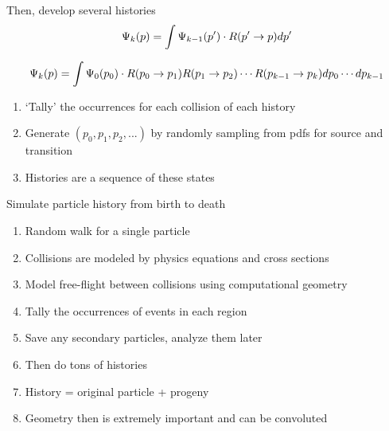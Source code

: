 \documentclass[aspectratio=1610,pdftex,dvipsnames,compress,xcolor={dvipsnames}]{beamer}
\begin{document}
\addtocounter{framenumber}{-1} 
\begin{frame}{Then, develop several histories}
    \begin{equation}
        \LARGE
        \Psi_k(p) = \int \Psi_{k-1}(p') \cdot R(p' \rightarrow p)dp'
    \end{equation}

    \begin{equation}
        \large
        \Psi_k(p) = \int \Psi_0(p_0) \cdot R(p_0 \rightarrow p_1) R(p_1 \rightarrow p_2) \cdots R(p_{k-1} \rightarrow p_k)dp_0 \cdots dp_{k-1}
    \end{equation}

    \vspace*{\fill}

    \begin{enumerate}[series=outerlist,topsep=0pt,itemsep=21pt,leftmargin=*,label=(\arabic*)]
        \item[]`Tally' the occurrences for each collision of each history
        \item[]Generate $(p_0,p_1,p_2,...)$ by randomly sampling from pdfs for source and transition
        \item[]Histories are a sequence of these states
    \end{enumerate}
\end{frame}


\begin{frame}{Simulate particle history from birth to death}
    \begin{enumerate}[series=outerlist,topsep=0pt,itemsep=17pt,leftmargin=*,label=(\arabic*)]
        \item[]Random walk for a single particle
        \item[]Collisions are modeled by physics equations and cross sections
        \item[]Model free-flight between collisions using computational geometry
        \item[]Tally the occurrences of events in each region
        \item[]Save any secondary particles, analyze them later
        \item[]Then do tons of histories
        \item[]History = original particle + progeny
        \item[]Geometry then is extremely important and can be convoluted
    \end{enumerate}
\end{frame}
\end{document}
